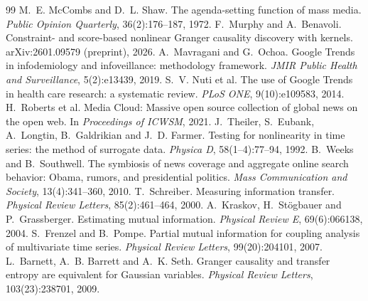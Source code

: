 \documentclass[11pt,a4paper]{article}
\begin{document}
\begin{thebibliography}{99}
 M.~E. McCombs and D.~L. Shaw. The agenda-setting function of mass media. \emph{Public Opinion Quarterly}, 36(2):176--187, 1972.
 F.~Murphy and A.~Benavoli. Constraint- and score-based nonlinear Granger causality discovery with kernels. arXiv:2601.09579 (preprint), 2026.
 A.~Mavragani and G.~Ochoa. Google Trends in infodemiology and infoveillance: methodology framework. \emph{JMIR Public Health and Surveillance}, 5(2):e13439, 2019.
 S.~V. Nuti et al. The use of Google Trends in health care research: a systematic review. \emph{PLoS ONE}, 9(10):e109583, 2014.
 H.~Roberts et al. Media Cloud: Massive open source collection of global news on the open web. In \emph{Proceedings of ICWSM}, 2021.
 J.~Theiler, S.~Eubank, A.~Longtin, B.~Galdrikian and J.~D. Farmer. Testing for nonlinearity in time series: the method of surrogate data. \emph{Physica D}, 58(1--4):77--94, 1992.
 B.~Weeks and B.~Southwell. The symbiosis of news coverage and aggregate online search behavior: Obama, rumors, and presidential politics. \emph{Mass Communication and Society}, 13(4):341--360, 2010.
 T.~Schreiber. Measuring information transfer. \emph{Physical Review Letters}, 85(2):461--464, 2000.
 A.~Kraskov, H.~St\"ogbauer and P.~Grassberger. Estimating mutual information. \emph{Physical Review E}, 69(6):066138, 2004.
 S.~Frenzel and B.~Pompe. Partial mutual information for coupling analysis of multivariate time series. \emph{Physical Review Letters}, 99(20):204101, 2007.
 L.~Barnett, A.~B. Barrett and A.~K. Seth. Granger causality and transfer entropy are equivalent for Gaussian variables. \emph{Physical Review Letters}, 103(23):238701, 2009.
\end{thebibliography}

\appendix
\end{document}

